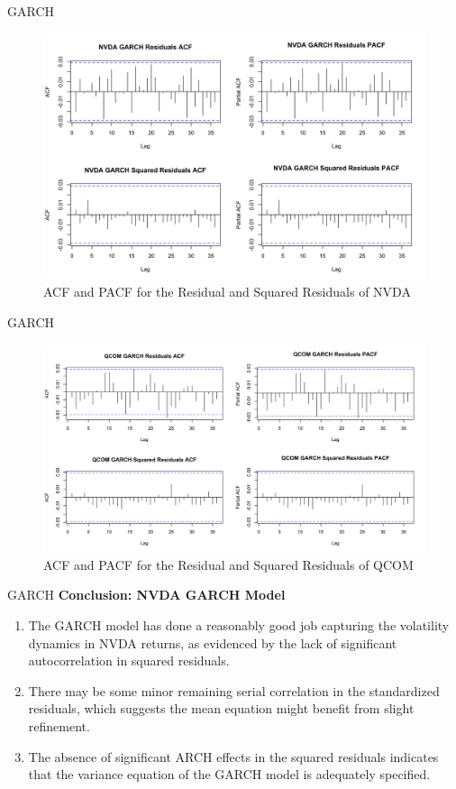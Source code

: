 \documentclass{beamer}[9pt]
\begin{document}
\begin{frame}{GARCH}
		\begin{figure}[!h]
		\centering
		\includegraphics[width=0.65\linewidth]{plots/GARCH_NVDA.png}
		\caption{ACF and PACF for the Residual and Squared Residuals of NVDA}
	\end{figure}
\end{frame}

\begin{frame}{GARCH}
	\begin{figure}[!h]
		\centering
		\includegraphics[width=0.8\linewidth]{plots/GARCH_QCOM.png}
		\caption{ACF and PACF for the Residual and Squared Residuals of QCOM}
	\end{figure}
\end{frame}

\begin{frame}{GARCH}
	\textbf{Conclusion: NVDA GARCH Model}
	\begin{enumerate}
		\item The GARCH model has done a reasonably good job capturing the volatility dynamics in NVDA returns, as evidenced by the lack of significant autocorrelation in squared residuals.
		\item There may be some minor remaining serial correlation in the standardized residuals, which suggests the mean equation might benefit from slight refinement.
		\item The absence of significant ARCH effects in the squared residuals indicates that the variance equation of the GARCH model is adequately specified.
	\end{enumerate}
\end{frame}
\end{document}
